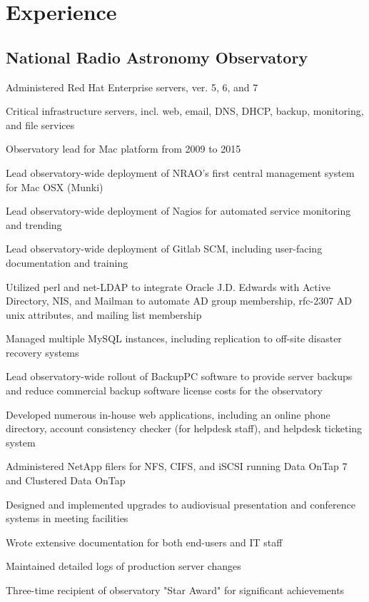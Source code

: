 \documentclass[letterpaper]{deedy-resume}
\begin{document}
\begin{minipage}[t]{0.69\textwidth} %
\vspace{3pt}

\section{Experience}
	
\subsection{National Radio Astronomy Observatory}

\begin{tightitemize}
	\item Administered Red Hat Enterprise servers, ver. 5, 6, and 7
	\item Critical infrastructure servers, incl. web, email, DNS, DHCP, backup, monitoring, and file services
	\item Observatory lead for Mac platform from 2009 to 2015
	\item Lead observatory-wide deployment of NRAO's first central management system for Mac OSX (Munki)
	\item Lead observatory-wide deployment of Nagios for automated service monitoring and trending
	\item Lead observatory-wide deployment of Gitlab SCM, including user-facing	documentation and training
	\item Utilized perl and net-LDAP to integrate Oracle J.D. Edwards with Active Directory, NIS, and Mailman to automate AD group membership, rfc-2307 AD unix attributes, and mailing list membership
	\item Managed multiple MySQL instances, including replication to off-site disaster recovery systems
	\item Lead observatory-wide rollout of BackupPC software to provide  server backups and reduce commercial backup software license costs for the observatory
	\item Developed numerous in-house web applications, including an online phone directory, account consistency checker (for helpdesk staff), and helpdesk ticketing system
	\item Administered NetApp filers for NFS, CIFS, and iSCSI running Data OnTap 7 and Clustered Data OnTap
	\item Designed and implemented upgrades to audiovisual presentation and conference systems in meeting facilities
	\item Wrote extensive documentation for both end-users and IT staff
	\item Maintained detailed logs of production server changes
	\item Three-time recipient of observatory "Star Award" for significant achievements
\end{tightitemize}


\end{minipage}
\end{document}
